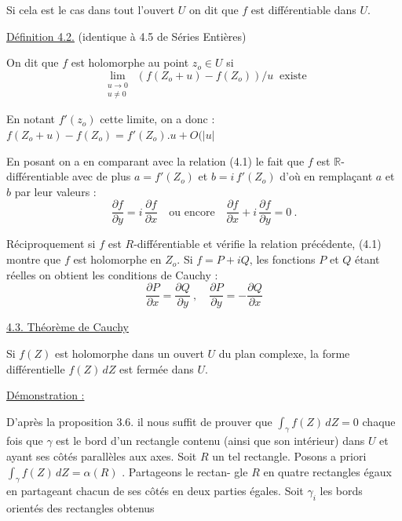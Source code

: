 
Si cela est le cas dans tout l'ouvert  $U$  on dit que  $f$  est 
différentiable dans  $U$.

\uline{Définition 4.2.}  (identique à 4.5 de Séries  Entières)

On dit que  $f$  est holomorphe au point  $z_o \in U$  si
\[ \lim_{\substack{u\to 0\\ u\neq 0}} \ (f(Z_o+u) - f(Z_o))/u \ \text{ existe} \]

En notant  $f'(z_o)$  cette limite, on a donc :  $f(Z_o+u)-f(Z_o) = f'(Z_o).u + O(|u|$\unsure{$^\circ$}

En posant    on a en comparant avec la relation  (4.1)  le fait
que  $f$  est $\mathbb{R}$-différentiable avec de plus  $a = f'(Z_o)$ et $b = i\, f'(Z_o)$
d'où en remplaçant  $a$ et $b$  par leur valeurs :
\[ \frac{\partial f}{\partial y} = i\,\frac{\partial f}{\partial x} \quad \text{ou encore} \quad \frac{\partial f}{\partial x} + i\,\frac{\partial f}{\partial y} = 0 \ . \]

Réciproquement si  $f$  est  $R$-différentiable et vérifie la relation précédente,
(4.1) montre que  $f$  est holomorphe en  $Z_o$. Si  $f = P + iQ$, les fonctions
$P$ et $Q$  étant réelles on obtient les conditions de Cauchy :
\[ \frac{\partial P}{\partial x} = \frac{\partial Q}{\partial y} \ , \quad \frac{\partial P}{\partial y} = -\frac{\partial Q}{\partial x} \]

\uline{4.3. Théorème de Cauchy}

Si  $f(Z)$  est holomorphe dans un ouvert  $U$  du plan complexe, la
forme différentielle  $f(Z)\, dZ$  est fermée dans  $U$.

\uline{Démonstration :}

D'après la proposition 3.6. il nous suffit de prouver que
$\int_\gamma f(Z)\, dZ = 0$  chaque fois que  $\gamma$  est le bord d'un rectangle contenu (ainsi
que son intérieur) dans  $U$  et ayant ses côtés parallèles aux axes. Soit  $R$
un tel rectangle. Posons a priori  $\int_\gamma f(Z)\, dZ = \alpha(R)$ . Partageons le rectan-%
gle  $R$  en quatre rectangles égaux en partageant chacun de ses côtés en
deux parties égales. Soit  $\gamma_i$  les bords orientés des rectangles obtenus

